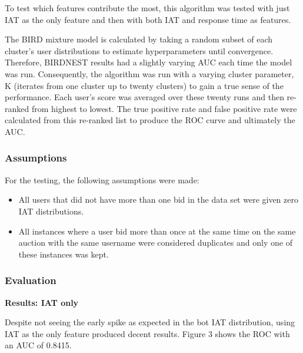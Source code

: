 \documentclass{article} %
\begin{document}
To test which features contribute the most, this algorithm was tested with just IAT as the only feature and then with both IAT and response time as features.

The BIRD mixture model is calculated by taking a random subset of each cluster's user distributions to estimate hyperparameters until convergence. Therefore, BIRDNEST results had a slightly varying AUC each time the model was run. Consequently, the algorithm was run with a varying cluster parameter, K (iterates from one cluster up to twenty clusters) to gain a true sense of the performance. Each user's score was averaged over these twenty runs and then re-ranked from highest to lowest. The true positive rate and false positive rate were calculated from this re-ranked list to produce the ROC curve and ultimately the AUC.

\subsubsection{Assumptions}

For the testing, the following assumptions were made:
\begin{itemize}
\item All users that did not have more than one bid in the data set were given zero IAT distributions.
\item All instances where a user bid more than once at the same time on the same auction with the same username were considered duplicates and only one of these instances was kept.
\end{itemize}

\subsubsection{Evaluation}

\textbf{Results: IAT only}

Despite not seeing the early spike as expected in the bot IAT distribution, using IAT as the only feature produced decent results.
Figure 3 shows the ROC with an AUC of 0.8415.
\end{document}
